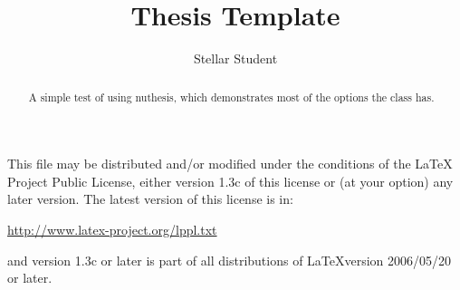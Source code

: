 \documentclass[ms,twoside,print]{nuthesis}
\begin{document}
\frontmatter

\title{Thesis Template}
\author{Stellar Student}
\maketitle
\begin{abstract}
  A simple test of using \textsf{nuthesis}, which demonstrates most
  of the options the class has.
\end{abstract}

\begin{copyrightpage}
This file may be distributed and/or modified under the conditions of
the \LaTeX{} Project Public License, either version 1.3c of this license
or (at your option) any later version.  The latest version of this
license is in:
\begin{center}
   \url{http://www.latex-project.org/lppl.txt}
\end{center}
and version 1.3c or later is part of all distributions of \LaTeX version
2006/05/20 or later.
\end{copyrightpage}


\end{document}
